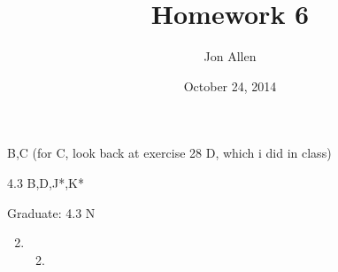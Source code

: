 \documentclass[letterpaper]{article}
\begin{document}
\title{Homework 6}
\date{October 24, 2014}
\author{Jon Allen}
 B,C (for C, look back at exercise 28 D, which i did in class)

4.3 B,D,J*,K*

Graduate: 4.3 N
\renewcommand{\labelenumi}{3.\arabic{enumi}}
\renewcommand{\labelenumii}{\Alph{enumii}.}
\renewcommand{\labelenumiii}{(\alph{enumiii})}
\begin{enumerate}
\setcounter{enumi}{1}
\item
  \begin{enumerate}
  \setcounter{enumii}{1}
  \item
  \end{enumerate}
\end{enumerate}
\end{document}
